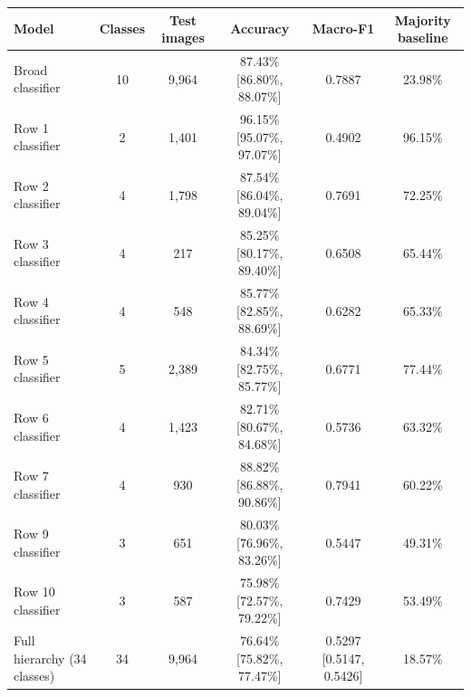 \begin{tabular}{lccccc}
\toprule
\textbf{Model} & \textbf{Classes} & \textbf{Test images} & \textbf{Accuracy} & \textbf{Macro-F1} & \textbf{Majority baseline} \\
\midrule
Broad classifier & 10 & 9,964 & 87.43\% [86.80\%, 88.07\%] & 0.7887 & 23.98\% \\
\midrule
Row 1 classifier & 2 & 1,401 & 96.15\% [95.07\%, 97.07\%] & 0.4902 & 96.15\% \\
Row 2 classifier & 4 & 1,798 & 87.54\% [86.04\%, 89.04\%] & 0.7691 & 72.25\% \\
Row 3 classifier & 4 & 217 & 85.25\% [80.17\%, 89.40\%] & 0.6508 & 65.44\% \\
Row 4 classifier & 4 & 548 & 85.77\% [82.85\%, 88.69\%] & 0.6282 & 65.33\% \\
Row 5 classifier & 5 & 2,389 & 84.34\% [82.75\%, 85.77\%] & 0.6771 & 77.44\% \\
Row 6 classifier & 4 & 1,423 & 82.71\% [80.67\%, 84.68\%] & 0.5736 & 63.32\% \\
Row 7 classifier & 4 & 930 & 88.82\% [86.88\%, 90.86\%] & 0.7941 & 60.22\% \\
Row 9 classifier & 3 & 651 & 80.03\% [76.96\%, 83.26\%] & 0.5447 & 49.31\% \\
Row 10 classifier & 3 & 587 & 75.98\% [72.57\%, 79.22\%] & 0.7429 & 53.49\% \\
\midrule
Full hierarchy (34 classes) & 34 & 9,964 & 76.64\% [75.82\%, 77.47\%] & 0.5297 [0.5147, 0.5426] & 18.57\% \\
\bottomrule
\end{tabular}
